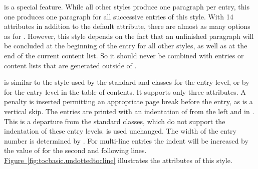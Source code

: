 \begin{description}
  is a special feature. While all other styles produce one paragraph per
  entry, this one produces one paragraph for all successive entries of this
  style. With 14
  attributes in addition to the default  attribute, there are
  almost as many options as for . However, this style
  depends on the fact that an unfinished paragraph will be concluded at the
  beginning of the entry for all other styles, as well as at the end of the
  current content list. So it should never be combined with entries or content
  lists that are generated outside of .
\item[\PValue{undottedtocline}] is similar to the style used by the standard
   and  classes for the  entry
  level, or by  for the  entry level in the
  table of contents. It supports only three attributes. A penalty is inserted permitting
  an appropriate page break before the entry, as is a vertical skip. The
  entries are printed with an indentation of  from the left and
  in . This is a departure from the standard classes, which do
  not support the indentation of these entry levels.
   is used unchanged. The width of the
  entry number is determined by . For multi-line entries the
  indent will be increased by the value of  for the second
  and following lines. \hyperref[fig:tocbasic.undottedtocline]%
  {Figure~\ref*{fig:tocbasic.undottedtocline}} illustrates the attributes of
  this style.
  \begin{figure}
    \centering
\end{figure}
\end{description}
